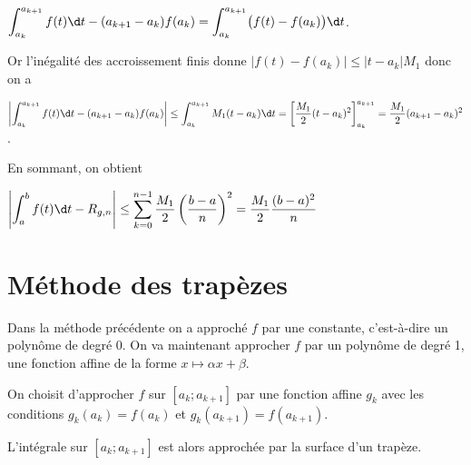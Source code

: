 \begin{Answer}
$\displaystyle \int_{a_k}^{a_{k+1}} f(t)\d t -(a_{k+1}- a_k) f(a_k) = \int_{a_k}^{a_{k+1}} \bigl(f(t)-f(a_k)\bigr) \d t$.

Or l'inégalité des accroissement finis donne $\bigl|f(t)-f(a_k)\bigr| \le |t-a_k|M_1$ donc on a 

$\displaystyle \left|\int_{a_k}^{a_{k+1}} f(t)\d t -(a_{k+1}- a_k) f(a_k)\right| \le \int_{a_k}^{a_{k+1}} M_1(t-a_k)\d t = \left[\frac{M_1}2(t-a_k)^2\right]_{a_k}^{a_{k+1}}
=\frac{M_1}2(a_{k+1}- a_k)^2$.

En sommant, on obtient

$\displaystyle \left|\int_a^b f(t)\d t - R_{g, n}\right| \le  \sum_{k=0}^{n-1}\frac{M_1}{2} \left(\frac{b-a}{n}\right)^2  = \frac{M_1}{2} \frac{(b-a)^2}{n} $

\end{Answer}
\newpage
\section{Méthode des trapèzes}
Dans la méthode précédente on a approché $f$ par une constante, c'est-à-dire un polynôme de degré 0. On va maintenant approcher $f$ par un polynôme de degré 1, une fonction affine de la forme $x\mapsto \alpha x + \beta$.

On choisit d'approcher $f$ sur $[a_k; a_{k+1}]$ par une fonction affine $g_k$ avec les conditions $g_k(a_k) = f(a_k)$ et  $g_k(a_{k+1}) = f(a_{k+1})$. 

L'intégrale sur $[a_k; a_{k+1}]$ est alors approchée par la surface d'un trapèze.

